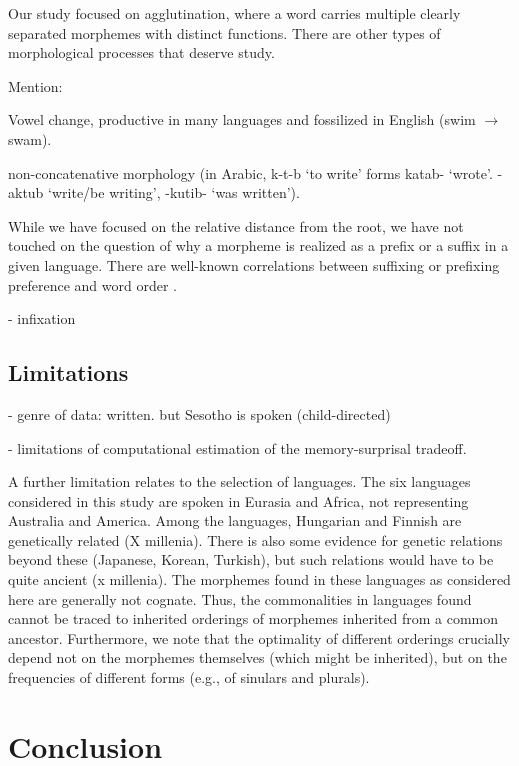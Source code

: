 \documentclass[11pt,letterpaper]{article}
\begin{document}
Our study focused on agglutination, where a word carries multiple clearly separated morphemes with distinct functions.
There are other types of morphological processes that deserve study.

Mention:

Vowel change, productive in many languages and fossilized in English (swim $\rightarrow$ swam).

non-concatenative morphology (in Arabic, k-t-b `to write' forms katab- `wrote'. -aktub `write/be writing', -kutib- `was written').

While we have focused on the relative distance from the root, we have not touched on the question of why a morpheme is realized as a prefix or a suffix in a given language.
There are well-known correlations between suffixing or prefixing preference and word order \citep{greenberg1963universals}.

- infixation



\subsection{Limitations}

- genre of data: written. but Sesotho is spoken (child-directed)

- limitations of computational estimation of the memory-surprisal tradeoff. %


A further limitation relates to the selection of languages.
The six languages considered in this study are spoken in Eurasia and Africa, not representing Australia and America.
Among the languages, Hungarian and Finnish are genetically related (X millenia).
There is also some evidence for genetic relations beyond these (Japanese, Korean, Turkish), but such relations would have to be quite ancient (x millenia).
The morphemes found in these languages as considered here are generally not cognate.
Thus, the commonalities in languages found cannot be traced to inherited orderings of morphemes inherited from a common ancestor.
Furthermore, we note that the optimality of different orderings crucially depend not on the morphemes themselves (which might be inherited), but on the frequencies of different forms (e.g., of sinulars and plurals).



\section{Conclusion}
\end{document}
